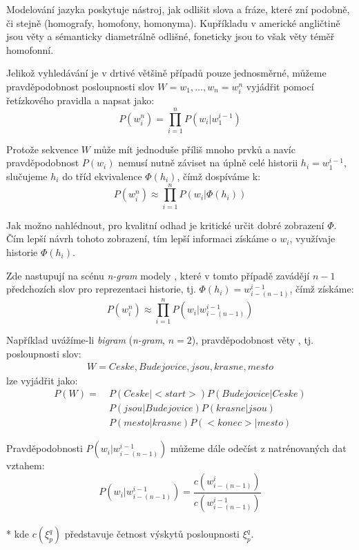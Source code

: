 Modelování jazyka poskytuje nástroj, jak odlišit slova a fráze, které zní podobně, či stejně (homografy, homofony, homonyma). Kupříkladu v americké angličtině jsou věty  a  sémanticky diametrálně odlišné, foneticky jsou to však věty téměř homofonní. 

Jelikož vyhledávání je v drtivé většině případů pouze jednosměrné, můžeme pravděpodobnost posloupnosti slov $W = w_1, \dots, w_n = w^n_i$ vyjádřit pomocí řetízkového pravidla a napsat jako:
%
\begin{equation}
	\label{eq:lm}
	P(w^n_i) = \prod\limits_{i=1}^n P(w_i|w^{i-1}_1)
\end{equation}

Protože sekvence $W$ může mít jednoduše příliš mnoho prvků a navíc pravděpodobnost $P(w_i)$ nemusí nutně záviset na úplně celé historii $h_i = w_1^{i-1}$, slučujeme $h_i$ do tříd ekvivalence $\Phi (h_i)$, čímž dospíváme k:
%
\begin{equation}
	\label{eq:lm_ec}
	P(w^n_i) \approx \prod\limits_{i=1}^n P(w_i|\Phi (h_i))
\end{equation}

Jak možno nahlédnout, pro kvalitní odhad je kritické určit dobré zobrazení $\Phi$. Čím lepší návrh tohoto zobrazení, tím lepší informaci získáme o $w_i$, využívaje historie $\Phi (h_i)$.

Zde nastupují na scénu {\sl n-gram} modely \cite{byeo_2012}\cite{masa_1997}, které v tomto případě zavádějí $n-1$ předchozích slov pro reprezentaci historie, tj. $\Phi (h_i) = w_{i-(n-1)}^{i-1}$, čímž získáme:
%
\begin{equation}
	\label{eq:lm_ec}
	P(w^n_i) \approx \prod\limits_{i=1}^n P(w_i|w_{i-(n-1)}^{i-1})
\end{equation}

Například uvážíme-li {\sl bigram} ({\sl n-gram}, $n = 2$), pravděpodobnost věty , tj. posloupnosti slov:
%
\begin{align*}
	W = Ceske, Budejovice, jsou, krasne, mesto
\end{align*}
%
lze vyjádřit jako:
%
\begin{align*}
	P(W) =&~P(Ceske|<\! start\!>)P(Budejovice|Ceske)\\
	      &~P(jsou|Budejovice)P(krasne|jsou)\\
	      &~P(mesto|krasne)P(<\! konec\!>|mesto)
\end{align*}

Pravděpodobnosti $P(w_i|w_{i-(n-1)}^{i-1})$ můžeme dále odečíst z natrénovaných dat vztahem:
%
\begin{equation}
	\label{eq:lm_est}
	P(w_i|w_{i-(n-1)}^{i-1}) = \frac{c(w_{i-(n-1)}^{i})}{c(w_{i-(n-1)}^{i-1})}
\end{equation}
\\*
kde $c(\xi_p^q)$ představuje četnost výskytů posloupnosti $\xi_p^q$.

